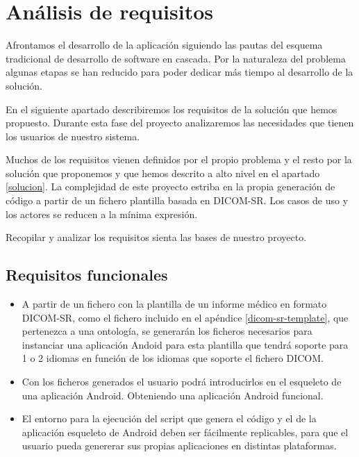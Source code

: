 \section{Análisis de requisitos}

Afrontamos el desarrollo de la aplicación siguiendo las pautas del esquema tradicional de desarrollo de software en cascada. Por la naturaleza del problema algunas etapas se han reducido para poder dedicar más tiempo al desarrollo de la solución.\medskip\par
En el siguiente apartado describiremos los requisitos de la solución que hemos propuesto. Durante esta fase del proyecto analizaremos las necesidades que tienen los usuarios de nuestro sistema.\par
Muchos de los requisitos vienen definidos por el propio problema y el resto por la solución que proponemos y que hemos descrito a alto nivel en el apartado \ref{solucion}. La complejidad de este proyecto estriba en la propia generación de código a partir de un fichero plantilla basada en DICOM-SR. Los casos de uso y los actores se reducen a la mínima expresión.\par
Recopilar y analizar los requisitos sienta las bases de nuestro proyecto.\par
\subsection{Requisitos funcionales}
\begin{itemize}
	\item A partir de un fichero con la plantilla de un informe médico en formato DICOM-SR, como el fichero incluido en el apéndice \ref{dicom-sr-template}, que pertenezca a una  ontología, se generarán los ficheros necesarios para instanciar una aplicación Andoid para esta plantilla que tendrá soporte para 1 o 2 idiomas en función de los idiomas que soporte el fichero DICOM.
	\item Con los ficheros generados el usuario podrá introducirlos en el esqueleto de una aplicación Android. Obteniendo una aplicación Android funcional.
	\item El entorno para la ejecución del script que genera el código y el de la aplicación esqueleto de Android deben ser fácilmente replicables, para que el usuario pueda genererar sus propias aplicaciones en distintas plataformas. 
\end{itemize}
